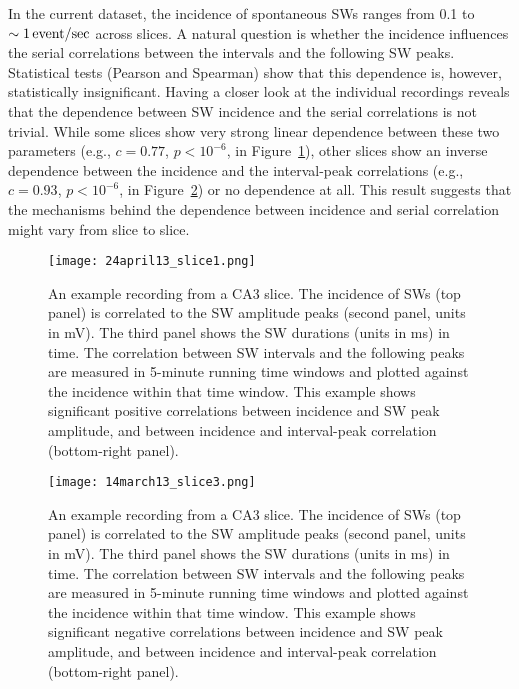     In the current dataset, the incidence of spontaneous SWs ranges from 0.1 to
    $\sim 1 \,\rm event/sec$ across slices. A natural question is whether the
    incidence influences the serial correlations between the intervals and the
    following SW peaks. Statistical tests (Pearson and Spearman) show that this
    dependence is, however, statistically insignificant. Having a closer look
    at the individual recordings reveals that the dependence between SW
    incidence and the serial correlations is not trivial. While some slices
    show very strong linear dependence between these two parameters (e.g.,
    $c=0.77$, $p<10^{-6}$, in Figure~\ref{fig:linear_inc-corr}), other slices
    show an inverse dependence between the incidence and the interval-peak
    correlations (e.g., $c=0.93$, $p<10^{-6}$, in
    Figure~\ref{fig:inv_linear_inc-corr}) or no dependence at all. This result
    suggests that the mechanisms behind the dependence between incidence and
    serial correlation might vary from slice to slice.
    
    \begin{figure}
      \centering
      \texttt{[image: 24april13\_slice1.png]}
      \caption{
        An example recording from a CA3 slice. The incidence of SWs (top panel)
        is correlated to the SW amplitude peaks (second panel, units in mV).
        The third panel shows the SW durations (units in ms) in time. The
        correlation between SW intervals and the following peaks are measured
        in 5-minute running time windows and plotted against the incidence
        within that time window. This example shows significant positive
        correlations between incidence and SW peak amplitude, and between
        incidence and interval-peak correlation (bottom-right panel).
             }
      \label{fig:linear_inc-corr}
    \end{figure}

    \begin{figure}
      \centering
      \texttt{[image: 14march13\_slice3.png]}
      \caption{
        An example recording from a CA3 slice. The incidence of SWs (top panel)
        is correlated to the SW amplitude peaks (second panel, units in mV).
        The third panel shows the SW durations (units in ms) in time. The
        correlation between SW intervals and the following peaks are measured
        in 5-minute running time windows and plotted against the incidence
        within that time window. This example shows significant negative
        correlations between incidence and SW peak amplitude, and between
        incidence and interval-peak correlation (bottom-right panel).
             }
      \label{fig:inv_linear_inc-corr}
    \end{figure}

